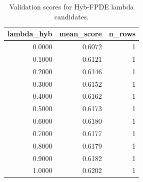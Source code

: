 \begin{table}[t]
\caption{Validation scores for Hyb-FPDE lambda candidates.}
\label{tab:lambda_distribution_computed}
\centering
\begin{tabular}{rrr}
\toprule
lambda\_hyb & mean\_score & n\_rows \\
\midrule
0.0000 & 0.6072 & 1 \\
0.1000 & 0.6121 & 1 \\
0.2000 & 0.6146 & 1 \\
0.3000 & 0.6152 & 1 \\
0.4000 & 0.6162 & 1 \\
0.5000 & 0.6173 & 1 \\
0.6000 & 0.6180 & 1 \\
0.7000 & 0.6177 & 1 \\
0.8000 & 0.6179 & 1 \\
0.9000 & 0.6182 & 1 \\
1.0000 & 0.6202 & 1 \\
\bottomrule
\end{tabular}

\end{table}
